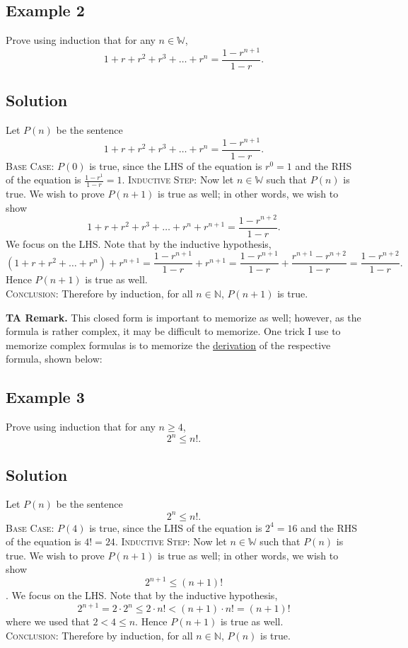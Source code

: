 \documentclass{article}
\begin{document}
\subsection*{Example 2}
    Prove using induction that for any $n \in \mathbb{W}$, $$1 + r + r^{2} + r^{3} + \dots + r^{n}= \frac{1 - r^{n + 1}}{1 - r}.$$

\subsection*{Solution}
    Let $P(n)$ be the sentence $$1 + r + r^{2} + r^{3} + \dots + r^{n}= \frac{1 - r^{n + 1}}{1 - r}.$$
    \textsc{Base Case}: $P(0)$ is true, since the LHS of the equation is $r^{0} = 1$ and the RHS of the equation is $\frac{1 - r^{1}}{1 - r} = 1.$
    \textsc{Inductive Step}: Now let $n \in \mathbb{W}$ such that $P(n)$ is true. We wish to prove $P(n + 1)$ is true as well; in other words, we wish to show $$1 + r + r^{2} + r^{3} + \dots + r^{n} + r^{n + 1} = \frac{1 - r^{n + 2}}{1 - r}.$$ We focus on the LHS. Note that by the inductive hypothesis, $$(1 + r + r^{2} + \dots + r^{n}) + r^{n + 1} = \frac{1 - r^{n + 1}}{1 - r} + r^{n + 1} = \frac{1 - r^{n + 1}}{1 - r} + \frac{r^{n + 1} - r^{n + 2}}{1 - r} = \frac{1 - r^{n + 2}}{1 - r}.$$
    Hence $P(n + 1)$ is true as well. \\
    \textsc{Conclusion}: Therefore by induction, for all $n \in \mathbb{N}$, $P(n + 1)$ is true.
    
    \vspace{1.5mm}
    \textbf{TA Remark.} This closed form is important to memorize as well; however, as the formula is rather complex, it may be difficult to memorize. One trick I use to memorize complex formulas is to memorize the \underline{derivation} of the respective formula, shown below:
    

\subsection*{Example 3}
    Prove using induction that for any $n \ge 4$, $$2^{n} \le n!.$$

\subsection*{Solution}
    Let $P(n)$ be the sentence $$2^{n} \le n!.$$
    \textsc{Base Case}: $P(4)$ is true, since the LHS of the equation is $2^4 = 16$ and the RHS of the equation is $4!=24.$
    \textsc{Inductive Step}: Now let $n \in \mathbb{W}$ such that $P(n)$ is true. We wish to prove $P(n + 1)$ is true as well; in other words, we wish to show $$2^{n+1}\leq (n+1)!$$. We focus on the LHS. Note that by the inductive hypothesis, $$2^{n+1} =2\cdot 2^n \leq 2\cdot n! < (n+1)\cdot n!=(n+1)!$$
    where we used that $2<4\leq n$. Hence $P(n + 1)$ is true as well. \\
    \textsc{Conclusion}: Therefore by induction, for all $n \in \mathbb{N}$, $P(n)$ is true.
\end{document}
